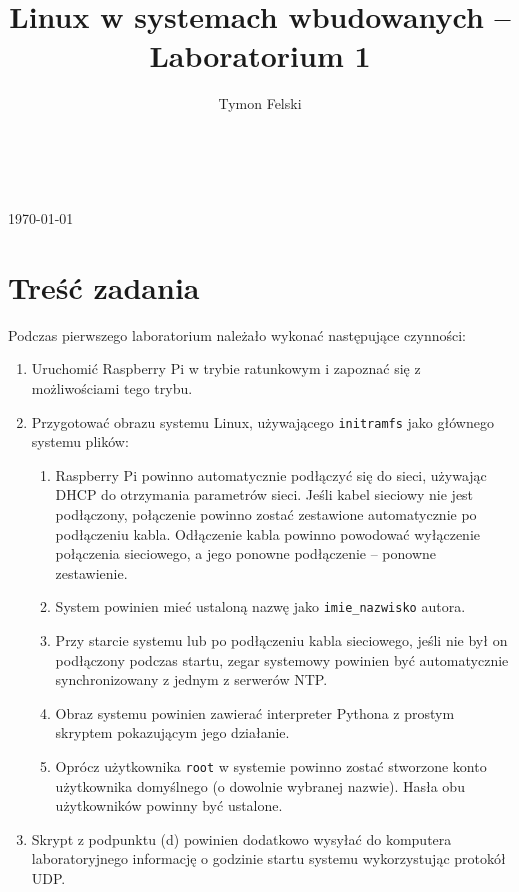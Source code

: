 \documentclass[10pt,a4paper]{article}
\title{Linux w systemach wbudowanych -- Laboratorium 1}
\author{Tymon Felski}
\begin{document}
\makeatletter
\begin{center}
	\LARGE{\@title}\\
	\vspace{.4cm}
	\Large{\@author}\\
	\vspace{.2cm}
	\large{\today}
\end{center}
\makeatother

\section{Treść zadania}
Podczas pierwszego laboratorium należało wykonać następujące czynności:
\begin{enumerate}
	\item Uruchomić Raspberry Pi w trybie ratunkowym i zapoznać się z możliwościami tego trybu.
	\item Przygotować obrazu systemu Linux, używającego \texttt{initramfs} jako głównego systemu plików:
	\begin{enumerate}
		\item Raspberry Pi powinno automatycznie podłączyć się do sieci, używając DHCP do otrzymania parametrów sieci. Jeśli kabel sieciowy nie jest podłączony, połączenie powinno zostać zestawione automatycznie po podłączeniu kabla. Odłączenie kabla powinno powodować wyłączenie połączenia sieciowego, a jego ponowne podłączenie – ponowne zestawienie.
		\item System powinien mieć ustaloną nazwę jako \texttt{imie\_nazwisko} autora.
		\item Przy starcie systemu lub po podłączeniu kabla sieciowego, jeśli nie był on podłączony podczas startu, zegar systemowy powinien być automatycznie synchronizowany z jednym z serwerów NTP.
		\item Obraz systemu powinien zawierać interpreter Pythona z prostym skryptem pokazującym jego działanie.
		\item Oprócz użytkownika \texttt{root} w systemie powinno zostać stworzone konto użytkownika domyślnego (o dowolnie wybranej nazwie). Hasła obu użytkowników powinny być ustalone.
	\end{enumerate}
	\item Skrypt z podpunktu (d) powinien dodatkowo wysyłać do komputera laboratoryjnego informację o godzinie startu systemu wykorzystując protokół UDP.
\end{enumerate}
\end{document}
